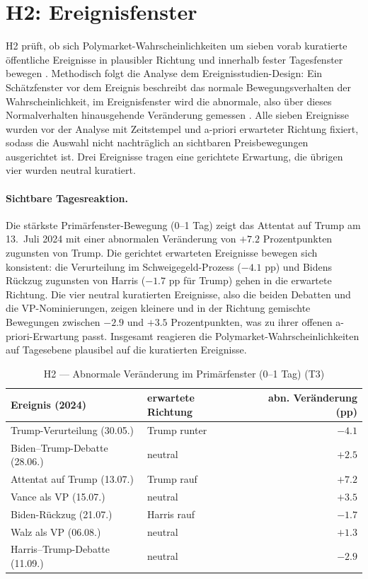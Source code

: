 \section{H2: Ereignisfenster}
\label{ch:h2}

H2 prüft, ob sich Polymarket-Wahrscheinlichkeiten um sieben vorab kuratierte
öffentliche Ereignisse in plausibler Richtung und innerhalb fester Tagesfenster
bewegen \citep{lit_eventstudy_001,lit_emh_001}. Methodisch folgt die Analyse dem
Ereignisstudien-Design: Ein Schätzfenster vor dem Ereignis beschreibt das normale
Bewegungsverhalten der Wahrscheinlichkeit, im Ereignisfenster wird die abnormale,
also über dieses Normalverhalten hinausgehende Veränderung gemessen
\citep{lit_eventstudy_001}. Alle sieben Ereignisse wurden vor der Analyse mit
Zeitstempel und a-priori erwarteter Richtung fixiert, sodass die Auswahl nicht
nachträglich an sichtbaren Preisbewegungen ausgerichtet ist. Drei Ereignisse
tragen eine gerichtete Erwartung, die übrigen vier wurden neutral kuratiert.

\paragraph{Sichtbare Tagesreaktion.}
Die stärkste Primärfenster-Bewegung (0--1 Tag) zeigt das Attentat auf Trump am
13.~Juli 2024 mit einer abnormalen Veränderung von $+7.2$ Prozentpunkten zugunsten
von Trump. Die gerichtet erwarteten Ereignisse bewegen sich konsistent: die
Verurteilung im Schweigegeld-Prozess ($-4.1$ pp) und Bidens Rückzug zugunsten
von Harris ($-1.7$ pp für Trump) gehen in die erwartete Richtung. Die vier neutral
kuratierten Ereignisse, also die beiden Debatten und die VP-Nominierungen, zeigen
kleinere und in der Richtung gemischte Bewegungen zwischen $-2.9$ und $+3.5$
Prozentpunkten, was zu ihrer offenen a-priori-Erwartung passt. Insgesamt reagieren
die Polymarket-Wahrscheinlichkeiten auf Tagesebene plausibel auf die kuratierten
Ereignisse.

\begin{table}[ht]
\centering
\caption{H2 --- Abnormale Veränderung im Primärfenster (0--1 Tag) (T3)}
\label{tab:t3}
\small
\begin{tabular}{@{}llr@{}}
\toprule
Ereignis (2024) & erwartete Richtung & abn. Veränderung (pp) \\
\midrule
Trump-Verurteilung (30.05.) & Trump runter & $-4.1$ \\
Biden--Trump-Debatte (28.06.) & neutral & $+2.5$ \\
Attentat auf Trump (13.07.) & Trump rauf & $+7.2$ \\
Vance als VP (15.07.) & neutral & $+3.5$ \\
Biden-Rückzug (21.07.) & Harris rauf & $-1.7$ \\
Walz als VP (06.08.) & neutral & $+1.3$ \\
Harris--Trump-Debatte (11.09.) & neutral & $-2.9$ \\
\bottomrule
\end{tabular}
\end{table}

